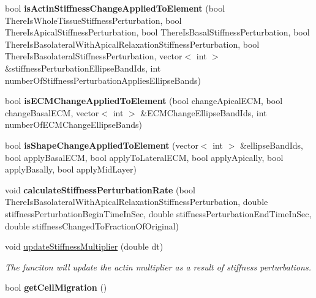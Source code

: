 \begin{DoxyCompactItemize}
\item 
\hypertarget{classShapeBase_adc6d308163a1f09f654008a7b91e5b0a}{}bool {\bfseries is\+Actin\+Stiffness\+Change\+Applied\+To\+Element} (bool There\+Is\+Whole\+Tissue\+Stiffness\+Perturbation, bool There\+Is\+Apical\+Stiffness\+Perturbation, bool There\+Is\+Basal\+Stiffness\+Perturbation, bool There\+Is\+Basolateral\+With\+Apical\+Relaxation\+Stiffness\+Perturbation, bool There\+Is\+Basolateral\+Stiffness\+Perturbation, vector$<$ int $>$ \&stiffness\+Perturbation\+Ellipse\+Band\+Ids, int number\+Of\+Stiffness\+Perturbation\+Applies\+Ellipse\+Bands)\label{classShapeBase_adc6d308163a1f09f654008a7b91e5b0a}

\item 
\hypertarget{classShapeBase_accfdf899a255100c440aed31c8ec53e4}{}bool {\bfseries is\+E\+C\+M\+Change\+Applied\+To\+Element} (bool change\+Apical\+E\+C\+M, bool change\+Basal\+E\+C\+M, vector$<$ int $>$ \&E\+C\+M\+Change\+Ellipse\+Band\+Ids, int number\+Of\+E\+C\+M\+Change\+Ellipse\+Bands)\label{classShapeBase_accfdf899a255100c440aed31c8ec53e4}

\item 
\hypertarget{classShapeBase_ab46031b73b9f1054d56b26e3b3135a75}{}bool {\bfseries is\+Shape\+Change\+Applied\+To\+Element} (vector$<$ int $>$ \&ellipse\+Band\+Ids, bool apply\+Basal\+E\+C\+M, bool apply\+To\+Lateral\+E\+C\+M, bool apply\+Apically, bool apply\+Basally, bool apply\+Mid\+Layer)\label{classShapeBase_ab46031b73b9f1054d56b26e3b3135a75}

\item 
\hypertarget{classShapeBase_aef460b84dc469f89742af7c19411454f}{}void {\bfseries calculate\+Stiffness\+Perturbation\+Rate} (bool There\+Is\+Basolateral\+With\+Apical\+Relaxation\+Stiffness\+Perturbation, double stiffness\+Perturbation\+Begin\+Time\+In\+Sec, double stiffness\+Perturbation\+End\+Time\+In\+Sec, double stiffness\+Changed\+To\+Fraction\+Of\+Original)\label{classShapeBase_aef460b84dc469f89742af7c19411454f}

\item 
\hypertarget{classShapeBase_a4eb97c0c1a988e77126809745b191c02}{}void \hyperlink{classShapeBase_a4eb97c0c1a988e77126809745b191c02}{update\+Stiffness\+Multiplier} (double dt)\label{classShapeBase_a4eb97c0c1a988e77126809745b191c02}

\begin{DoxyCompactList}\small\item\em The funciton will update the actin multiplier as a result of stiffness perturbations. \end{DoxyCompactList}\item 
\hypertarget{classShapeBase_ae9c2033249b0390ac5b2e05b6c88652a}{}bool {\bfseries get\+Cell\+Migration} ()\label{classShapeBase_ae9c2033249b0390ac5b2e05b6c88652a}


\end{DoxyCompactItemize}
